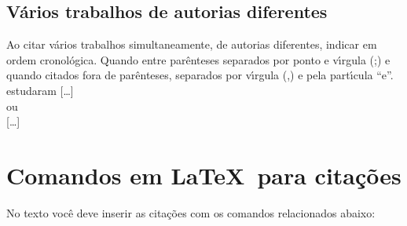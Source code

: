 \subsection{V\'arios trabalhos de autorias diferentes}

Ao citar v\'arios trabalhos simultaneamente, de autorias diferentes, indicar
em ordem cronol\'ogica. Quando entre par\^enteses separados por ponto e
v\'{\i}rgula (;) e quando citados fora de par\^enteses, separados por v\'{\i}rgula (,) e pela
part\'{\i}cula “e”.\\

  estudaram [\ldots]\\
	
ou\\

[\ldots] \cite{Ando1990,Ferreira1989,SilvaRibeiro2001}  \\


\section{Comandos em \LaTeX\ para cita\c{c}\~oes}


No texto voc\^e deve inserir as cita\c{c}\~oes com os comandos relacionados abaixo:

